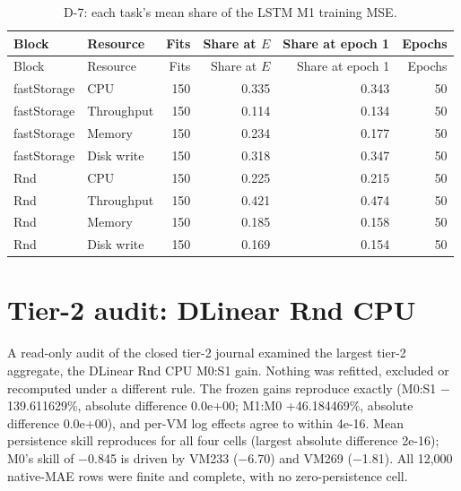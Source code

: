 \documentclass[a4paper,11pt]{article}
\begin{document}
\small
\setlength{\tabcolsep}{3pt}
\begin{longtable}{@{}llrrrr@{}}
\caption{D-7: each task's mean share of the LSTM M1 training MSE.}\label{tab:supp-t2-d7}\\
\toprule
Block & Resource & Fits & Share at $E$ & Share at epoch 1 & Epochs \\
\midrule
\endfirsthead
\toprule
Block & Resource & Fits & Share at $E$ & Share at epoch 1 & Epochs \\
\midrule
\endhead
\bottomrule
\endfoot
fastStorage & CPU & 150 & 0.335 & 0.343 & 50 \\
fastStorage & Throughput & 150 & 0.114 & 0.134 & 50 \\
fastStorage & Memory & 150 & 0.234 & 0.177 & 50 \\
fastStorage & Disk write & 150 & 0.318 & 0.347 & 50 \\
Rnd & CPU & 150 & 0.225 & 0.215 & 50 \\
Rnd & Throughput & 150 & 0.421 & 0.474 & 50 \\
Rnd & Memory & 150 & 0.185 & 0.158 & 50 \\
Rnd & Disk write & 150 & 0.169 & 0.154 & 50 \\
\end{longtable}
\normalsize\setlength{\tabcolsep}{4pt}
\clearpage
\section*{Tier-2 audit: DLinear Rnd CPU}
A read-only audit of the closed tier-2 journal examined the largest tier-2 aggregate{,} the DLinear Rnd CPU M0:S1 gain. Nothing was refitted{,} excluded or recomputed under a different rule. The frozen gains reproduce exactly (M0:S1 $-$139.611629\%{,} absolute difference 0.0e+00; M1:M0 +46.184469\%{,} absolute difference 0.0e+00){,} and per-VM log effects agree to within 4e-16. Mean persistence skill reproduces for all four cells (largest absolute difference 2e-16); M0's skill of $-$0.845 is driven by VM233 ($-$6.70) and VM269 ($-$1.81). All 12{,}000 native-MAE rows were finite and complete{,} with no zero-persistence cell.
\end{document}
